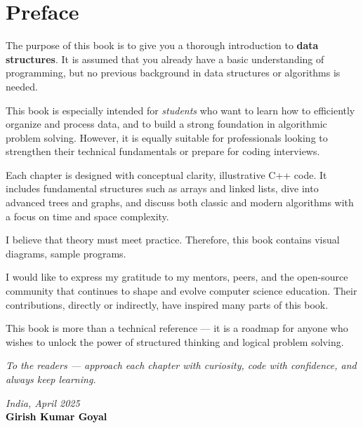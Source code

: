 \chapter*{\color{black}Preface}

\vspace{1em}

\begin{spacing}{1.2}
\color{black}

The purpose of this book is to give you a thorough introduction to \textbf{data structures}. It is assumed that you already have a basic understanding of programming, but no previous background in data structures or algorithms is needed.

\vspace{1em}

This book is especially intended for \textit{students} who want to learn how to efficiently organize and process data, and to build a strong foundation in algorithmic problem solving. However, it is equally suitable for professionals looking to strengthen their technical fundamentals or prepare for coding interviews.

\vspace{1em}

Each chapter is designed with conceptual clarity, illustrative C++ code. It includes fundamental structures such as arrays and linked lists, dive into advanced trees and graphs, and discuss both classic and modern algorithms with a focus on time and space complexity.

\vspace{1em}

I believe that theory must meet practice. Therefore, this book contains visual diagrams, sample programs.

\vspace{1em}

I would like to express my gratitude to my mentors, peers, and the open-source community that continues to shape and evolve computer science education. Their contributions, directly or indirectly, have inspired many parts of this book.

\vspace{1em}

This book is more than a technical reference — it is a roadmap for anyone who wishes to unlock the power of structured thinking and logical problem solving.

\vspace{1em}

\textit{To the readers — approach each chapter with curiosity, code with confidence, and always keep learning.}

\end{spacing}

\vspace{3em}

\begin{flushright}
\textcolor{gray!60!black}{\itshape India, April 2025} \\
\textbf{\textcolor{black}{Girish Kumar Goyal}}
\end{flushright}
